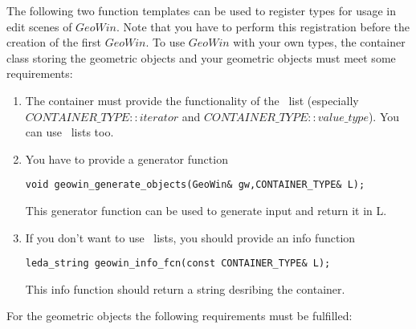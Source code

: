 The following two function templates can be used to register types for usage
in edit scenes of $GeoWin$. Note that you have to perform this registration before the creation
of the first $GeoWin$.
To use $GeoWin$ with your
own types, the container class storing the geometric objects and your geometric
objects must meet some requirements:
\begin{enumerate}
\item The container must provide the functionality of the \stl\ list (especially 
$CONTAINER\_TYPE::iterator$ and $CONTAINER\_TYPE::value\_type$).
You can use \leda\ lists too.
\item You have to provide a generator function
\begin{verbatim}
void geowin_generate_objects(GeoWin& gw,CONTAINER_TYPE& L);
\end{verbatim}
This generator function can be used to generate input and return it in L.
\item If you don't want to use \leda\ lists, you should provide an info function
\begin{verbatim}
leda_string geowin_info_fcn(const CONTAINER_TYPE& L);
\end{verbatim}
This info function should return a string desribing the container.
\end{enumerate}
For the geometric objects the following requirements must be fulfilled:
